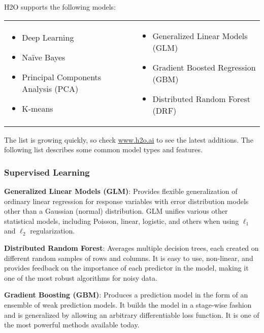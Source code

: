 {H2O supports the following models:  


\begin{frame}%

\begin{tabular}{p{5.5cm}p{5.5cm}}

\begin{itemize}
  \item Deep Learning
  \item Na\"{i}ve Bayes
  \item Principal Components Analysis (PCA)
  \item K-means
\end{itemize} &

\begin{itemize}
  \item Generalized Linear Models (GLM) 
  \item Gradient Boosted Regression (GBM)
  \item Distributed Random Forest (DRF)
\end{itemize}

\end{tabular}

\end{frame}


The list is growing quickly, so check \url{www.h2o.ai} to see the latest additions. The following list describes some common model types and features. 

\subsubsection{Supervised Learning}
{\textbf{Generalized Linear Models (GLM)}}: Provides flexible generalization of ordinary linear regression for response variables with error distribution models other than a Gaussian (normal) distribution. GLM unifies various other statistical models, including Poisson, linear, logistic, and others when using $\ell_1$ and $\ell_2$ regularization.

{\textbf{Distributed Random Forest}}: Averages multiple decision trees, each created on different random samples of rows and columns. It is easy to use, non-linear, and provides feedback on the importance of each predictor in the model, making it one of the most robust algorithms for noisy data.

{\textbf{Gradient Boosting (GBM)}}: Produces a prediction model in the form of an ensemble of weak prediction models. It builds the model in a stage-wise fashion and is generalized by allowing an arbitrary differentiable loss function. It is one of the most powerful methods available today.

}
